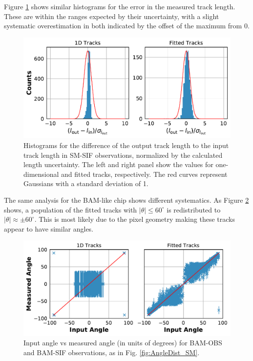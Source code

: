 \documentclass[a4paper, 11pt]{article}
\begin{document}
Figure \ref{fig:LenErr_SM} shows similar histograms for the error in the measured track length. These are within the ranges expected by their uncertainty, with a slight systematic overestimation in both indicated by the offset of the maximum from 0.

\begin{figure}[h]
  \centering
  \includegraphics[width=\textwidth]{images/postprocessing/LenErr_SM}
  \caption{Histograms for the difference of the output track length to the input track length in SM-SIF observations, normalized by the calculated length uncertainty. The left and right panel show the values for one-dimensional and fitted tracks, respectively. The red curves represent Gaussians with a standard deviation of 1.}
  \label{fig:LenErr_SM}
\end{figure}

The same analysis for the BAM-like chip shows different systematics. As Figure \ref{fig:AngleDist_BAM} shows, a population of the fitted tracks with $|\theta| \leq 60^{\circ}$ is redistributed to $|\theta| \approx \pm 60^{\circ}$. This is most likely due to the pixel geometry making these tracks appear to have similar angles.

\begin{figure}[h]
  \centering
  \includegraphics[width=\textwidth]{images/postprocessing/AngleDist_BAM}
  \caption{Input angle vs measured angle (in units of degrees) for BAM-OBS and BAM-SIF observations, as in Fig. \ref{fig:AngleDist_SM}.} 
  \label{fig:AngleDist_BAM}
\end{figure}
\end{document}
